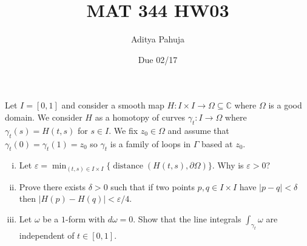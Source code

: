 \documentclass[10pt]{article}
\title{MAT 344 HW03}
\author{\large Aditya Pahuja}
\date{\large Due 02/17}
\providecommand{\eps}{\varepsilon}
\providecommand{\CC}{\mathbb C}
\providecommand{\ii}{\item}
\providecommand{\abs}[1]{\left\lvert #1\right\rvert}
\begin{document}
\maketitle

\begin{problem}
    Let $I = [0,1]$ and consider a smooth map
    $H\colon I\times I\to\Omega\subseteq\CC$
    where $\Omega$ is a good domain.
    We consider $H$ as a homotopy of curves
    $\gamma_t\colon I\to\Omega$
    where $\gamma_t(s) = H(t,s)$ for $s\in I$.
    We fix $z_0\in\Omega$ and assume that $\gamma_t(0)=\gamma_t(1)=z_0$
    so $\gamma_t$ is a family of loops in $\Gamma$ based at $z_0$.
    \begin{enumerate}[(i)]
	\ii Let $\eps = \min_{(t,s)\in I\times I}
	\{\operatorname{distance}(H(t,s),\partial\Omega)\}$.
	Why is $\eps > 0$?
	\ii Prove there exists $\delta > 0$ such that
	if two points $p,q\in I\times I$ have $\abs{p-q} < \delta$
	then $\abs{H(p) - H(q)} < \eps/4$.
	\ii Let $\omega$ be a $1$-form with $d\omega = 0$.
	Show that the line integrals $\int_{\gamma_t}\omega$
	are independent of $t\in[0,1]$.
    \end{enumerate}
\end{problem}
\end{document}
